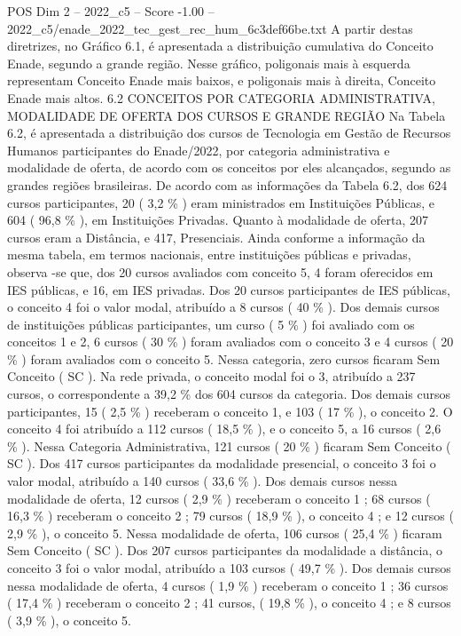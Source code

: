 \begin{textsample}{POS Dim 2 – 2022\_c5 – Score -1.00 – 2022\_c5/enade\_2022\_tec\_gest\_rec\_hum\_6c3def66be.txt}
A partir destas diretrizes, no Gráfico 6.1, é apresentada a distribuição cumulativa do Conceito Enade, segundo a grande região.
Nesse gráfico, poligonais mais à esquerda representam Conceito Enade mais baixos, e poligonais mais à direita, Conceito Enade mais altos. 6.2 CONCEITOS POR CATEGORIA ADMINISTRATIVA, MODALIDADE DE OFERTA DOS CURSOS E GRANDE REGIÃO Na Tabela 6.2, é apresentada a distribuição dos cursos de Tecnologia em Gestão de Recursos Humanos participantes do Enade/2022, por categoria administrativa e modalidade de oferta, de acordo com os conceitos por eles alcançados, segundo as grandes regiões brasileiras.
De acordo com as informações da Tabela 6.2, dos 624 cursos participantes, 20 ( 3,2 \% ) eram ministrados em Instituições Públicas, e 604 ( 96,8 \% ), em Instituições Privadas.
Quanto à modalidade de oferta, 207 cursos eram a Distância, e 417, Presenciais.
Ainda conforme a informação da mesma tabela, em termos nacionais, entre instituições públicas e privadas, observa -se que, dos 20 cursos avaliados com conceito 5, 4 foram oferecidos em IES públicas, e 16, em IES privadas.
Dos 20 cursos participantes de IES públicas, o conceito 4 foi o valor modal, atribuído a 8 cursos ( 40 \% ).
Dos demais cursos de instituições públicas participantes, um curso ( 5 \% ) foi avaliado com os conceitos 1 e 2, 6 cursos ( 30 \% ) foram avaliados com o conceito 3 e 4 cursos ( 20 \% ) foram avaliados com o conceito 5.
Nessa categoria, zero cursos ficaram Sem Conceito ( SC ).
Na rede privada, o conceito modal foi o 3, atribuído a 237 cursos, o correspondente a 39,2 \% dos 604 cursos da categoria.
Dos demais cursos participantes, 15 ( 2,5 \% ) receberam o conceito 1, e 103 ( 17 \% ), o conceito 2.
O conceito 4 foi atribuído a 112 cursos ( 18,5 \% ), e o conceito 5, a 16 cursos ( 2,6 \% ).
Nessa Categoria Administrativa, 121 cursos ( 20 \% ) ficaram Sem Conceito ( SC ).
Dos 417 cursos participantes da modalidade presencial, o conceito 3 foi o valor modal, atribuído a 140 cursos ( 33,6 \% ).
Dos demais cursos nessa modalidade de oferta, 12 cursos ( 2,9 \% ) receberam o conceito 1 ; 68 cursos ( 16,3 \% ) receberam o conceito 2 ; 79 cursos ( 18,9 \% ), o conceito 4 ; e 12 cursos ( 2,9 \% ), o conceito 5.
Nessa modalidade de oferta, 106 cursos ( 25,4 \% ) ficaram Sem Conceito ( SC ).
Dos 207 cursos participantes da modalidade a distância, o conceito 3 foi o valor modal, atribuído a 103 cursos ( 49,7 \% ).
Dos demais cursos nessa modalidade de oferta, 4 cursos ( 1,9 \% ) receberam o conceito 1 ; 36 cursos ( 17,4 \% ) receberam o conceito 2 ; 41 cursos, ( 19,8 \% ), o conceito 4 ; e 8 cursos ( 3,9 \% ), o conceito 5.

\end{textsample}

